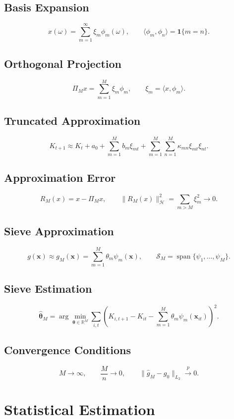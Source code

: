 \documentclass[11pt]{article}
\begin{document}
\subsection{Basis Expansion}
\[
x(\omega)=\sum_{m=1}^{\infty} \xi_m\phi_m(\omega),
\qquad \langle\phi_m,\phi_n\rangle=\mathbf{1}\{m=n\}.
\]

\subsection{Orthogonal Projection}
\[
\Pi_M x=\sum_{m=1}^M\xi_m\phi_m,
\qquad \xi_m=\langle x,\phi_m\rangle.
\]

\subsection{Truncated Approximation}
\[
K_{t+1}\approx K_t+a_0+\sum_{m=1}^M b_m\xi_{mt}+\sum_{m=1}^M\sum_{n=1}^M\kappa_{mn}\xi_{mt}\xi_{nt}.
\]

\subsection{Approximation Error}
\[
R_M(x)=x-\Pi_Mx,
\qquad \|R_M(x)\|_{\mathcal{H}}^2=\sum_{m>M}\xi_m^2\to 0.
\]

\subsection{Sieve Approximation}
\[
g(\bm{x})\approx g_M(\bm{x})=\sum_{m=1}^M \theta_m\psi_m(\bm{x}),
\qquad \mathcal{S}_M=\operatorname{span}\{\psi_1,\dots,\psi_M\}.
\]

\subsection{Sieve Estimation}
\[
\hat{\bm{\theta}}_M=\arg\min_{\bm{\theta}\in\mathbb{R}^M}\sum_{i,t}\left(K_{i,t+1}-K_{it}-\sum_{m=1}^M\theta_m\psi_m(\bm{x}_{it})\right)^2.
\]

\subsection{Convergence Conditions}
\[
M\to\infty,
\qquad \frac{M}{n}\to 0,
\qquad \|\hat g_M-g_0\|_{L_2}\xrightarrow{p}0.
\]

\section{Statistical Estimation}
\end{document}
